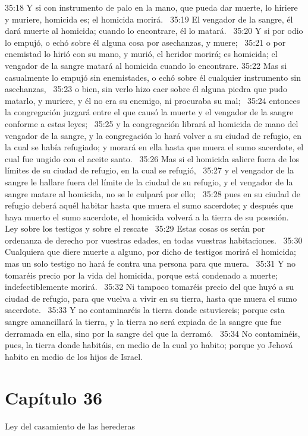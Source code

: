 35:18 Y si con instrumento de palo en la mano, que pueda dar muerte, lo hiriere y muriere, homicida es; el homicida morirá.  
35:19 El vengador de la sangre, él dará muerte al homicida; cuando lo encontrare, él lo matará.  
35:20 Y si por odio lo empujó, o echó sobre él alguna cosa por asechanzas, y muere;  
35:21 o por enemistad lo hirió con su mano, y murió, el heridor morirá; es homicida; el vengador de la sangre matará al homicida cuando lo encontrare. 
35:22 Mas si casualmente lo empujó sin enemistades, o echó sobre él cualquier instrumento sin asechanzas,  
35:23 o bien, sin verlo hizo caer sobre él alguna piedra que pudo matarlo, y muriere, y él no era su enemigo, ni procuraba su mal;  
35:24 entonces la congregación juzgará entre el que causó la muerte y el vengador de la sangre conforme a estas leyes;  
35:25 y la congregación librará al homicida de mano del vengador de la sangre, y la congregación lo hará volver a su ciudad de refugio, en la cual se había refugiado; y morará en ella hasta que muera el sumo sacerdote, el cual fue ungido con el aceite santo.  
35:26 Mas si el homicida saliere fuera de los límites de su ciudad de refugio, en la cual se refugió,  
35:27 y el vengador de la sangre le hallare fuera del límite de la ciudad de su refugio, y el vengador de la sangre matare al homicida, no se le culpará por ello;  
35:28 pues en su ciudad de refugio deberá aquél habitar hasta que muera el sumo sacerdote; y después que haya muerto el sumo sacerdote, el homicida volverá a la tierra de su posesión.  
Ley sobre los testigos y sobre el rescate  
35:29 Estas cosas os serán por ordenanza de derecho por vuestras edades, en todas vuestras habitaciones.  
35:30 Cualquiera que diere muerte a alguno, por dicho de testigos morirá el homicida; mas un solo testigo no hará fe contra una persona para que muera.  
35:31 Y no tomaréis precio por la vida del homicida, porque está condenado a muerte; indefectiblemente morirá.  
35:32 Ni tampoco tomaréis precio del que huyó a su ciudad de refugio, para que vuelva a vivir en su tierra, hasta que muera el sumo sacerdote.  
35:33 Y no contaminaréis la tierra donde estuviereis; porque esta sangre amancillará la tierra, y la tierra no será expiada de la sangre que fue derramada en ella, sino por la sangre del que la derramó.  
35:34 No contaminéis, pues, la tierra donde habitáis, en medio de la cual yo habito; porque yo Jehová habito en medio de los hijos de Israel.  
\section*{Capítulo 36}
Ley del casamiento de las herederas  

